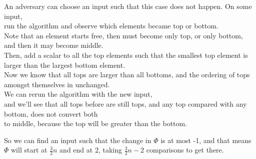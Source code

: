 \documentclass[11pt]{article}
\begin{document}
An adversary can choose an input such that this case does not happen. On some input,\\
run the algorithm and observe which elements became top or bottom.\\
Note that an element starts free, then must become only top, or only bottom, and then it may become middle.\\
Then, add a scalar to all the top elements such that the smallest top element is larger than the largest bottom element.\\
Now we know that all tops are larger than all bottoms, and the ordering of tops amongst themselves in unchanged.\\
We can rerun the algorithm with the new input,\\
and we'll see that all tops before are still tops, and any top compared with any bottom, does not convert both\\
to middle, because the top will be greater than the bottom.

So we can find an input such that the change in $\Phi$ is at most -1, and that means $\Phi$ will
start at $\frac{3}{2} n$ and end at $2$, taking $\frac{3}{2} n - 2$ comparisons to get there.
\end{document}
